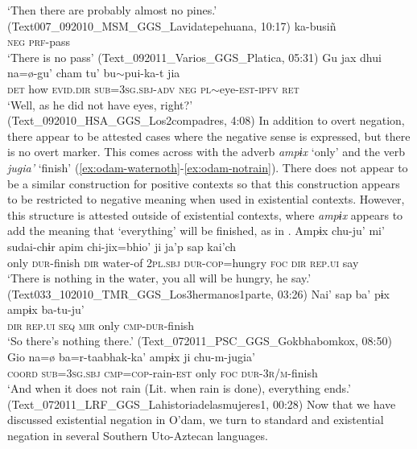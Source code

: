 \documentclass[output=paper]{langsci/langscibook}
\begin{document}
\glt ‘Then there are probably almost no pines.’ (Text007\_092010\_MSM\_GGS\_Lavidatepehuana, 10:17)
\z 
\ea
\label{ex:odam-nopass}
 	ka-busiñ\\
\textsc{neg}		\textsc{prf}-pass\\
\glt ‘There is no pass’ (Text\_092011\_Varios\_GGS\_Platica, 05:31)
\z 
\ea
\label{ex:odam-noeyes}
\gll Gu 	jax	dhui 		na=\o-gu’ 			{cham tu'} bu$\sim$pui-ka-t 				jia\\
\textsc{det} 	how 	\textsc{evid.dir} 	\textsc{sub=3sg.sbj-adv} 	\textsc{neg} \textsc{pl}$\sim$eye-\textsc{est-ipfv} 	\textsc{ret}\\
\glt ‘Well, as he did not have eyes, right?’ (Text\_092010\_HSA\_GGS\_Los2compadres, 4:08)
\z 
In addition to overt negation, there appear to be attested cases where the negative sense is expressed, but there is no overt marker. This comes across with the adverb \emph{ampɨx} ‘only’ and the verb \emph{jugia'} ‘finish’ (\ref{ex:odam-waternoth}-\ref{ex:odam-notrain}). There does not appear to be a similar construction for positive contexts so that this construction appears to be restricted to negative meaning when used in existential contexts. However, this structure is attested outside of existential contexts, where \emph{ampɨx} appears to add the meaning that ‘everything’ will be finished, as in .
\ea
\label{ex:odam-waternoth}
\gll Ampɨx chu-ju’ 	mi’ 	sudai-chɨr 	apim 		chi-jix=bhio' ji	ja’p 	sap 		kai'ch\\
only	\textsc{dur}-finish	\textsc{dir}	water-of	\textsc{2pl.sbj}	\textsc{dur-cop}=hungry \textsc{foc}	\textsc{dir}	\textsc{rep.ui}	say\\
\glt ‘There is nothing in the water, you all will be hungry, he say.’ (Text033\_102010\_TMR\_GGS\_Los3hermanos1parte, 03:26)
\z 
\ea
\label{ex:odam-noththere}
\gll Nai' 	sap 		ba' 	pɨx 	ampɨx 	ba-tu-ju'\\
\textsc{dir}	\textsc{rep.ui}	\textsc{seq}	\textsc{mir}	only	\textsc{cmp-dur}-finish\\
\glt ‘So there’s nothing there.’ (Text\_072011\_PSC\_GGS\_Gokbhabomkox, 08:50)
\z 
\ea
\label{ex:odam-notrain}
\gll Gio	   {na=\o} 		{ba=r-taabhak-ka’} 	ampɨx 	ji 	chu-m-jugia’\\
\textsc{coord} \textsc{sub=3sg.sbj} 	\textsc{cmp=cop}-rain-\textsc{est} 	only 	\textsc{foc} 	\textsc{dur-3r/m}-finish\\
\glt ‘And when it does not rain (Lit. when rain is done), everything ends.’ (Text\_072011\_LRF\_GGS\_Lahistoriadelasmujeres1, 00:28)
\z 
Now that we have discussed existential negation in O’dam, we turn to standard and existential negation in several Southern Uto-Aztecan languages.
\end{document}
